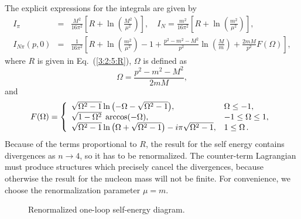 \documentclass[twoside,12pt]{article}
\begin{document}
   The explicit expressions for the integrals are given by
\begin{eqnarray}\label{Int}
  I_{\pi}&=&\frac{M^2}{16\pi^2}\left[R+\ln{\left(\frac{M^2}{\mu^2}\right)}\right],\quad
  I_{N}=\frac{m^2}{16\pi^2}
\left[R+\ln{\left(\frac{m^2}{\mu^2}\right)}\right],\nonumber\\
  I_{N\pi}(p,0)&=&\frac{1}{16\pi^2}
\left[R+\ln{\left(\frac{m^2}{\mu^2}\right)}-1
+
\frac{p^2-m^2-M^2}{p^2}\ln{\left(\frac{M}{m}\right)}
+\frac{2m M}{p^2}F(\Omega)\right],
\end{eqnarray}
where $R$ is given in Eq.~(\ref{3:2:5:R}), $\Omega$ is defined as
\begin{displaymath}
\Omega=\frac{p^2-m^2-M^2}{2m M},
\end{displaymath}
and
\begin{displaymath}
F(\Omega)=\left\{\begin{array}{l@{\quad}l}
\sqrt{\Omega^2-1}\ln{\left(-\Omega-\sqrt{\Omega^2-1}\right)}, &
\Omega\le -1,\\
\sqrt{1-\Omega^2}\;\arccos(-\Omega),&-1 \le\Omega\le 1,\\
\sqrt{\Omega^2-1}\ln{\left(\Omega+\sqrt{\Omega^2-1}\right)}
-i\pi\sqrt{\Omega^2-1}, & 1 \le \Omega\,.
\end{array}\right.
\end{displaymath}
   Because of the terms proportional to $R$, the result for the self
energy contains divergences as $n\rightarrow 4$, so it has to be
renormalized.
   The counter-term Lagrangian must produce structures
which precisely cancel the divergences, because otherwise the result
for the nucleon mass will not be finite.
   For convenience, we choose the renormalization parameter $\mu=m$.

\begin{figure}[t]
\begin{center}
\caption{\label{4:2:3:ren_diag}
Renormalized one-loop self-energy diagram.}
\end{center}
\end{figure}
\end{document}
